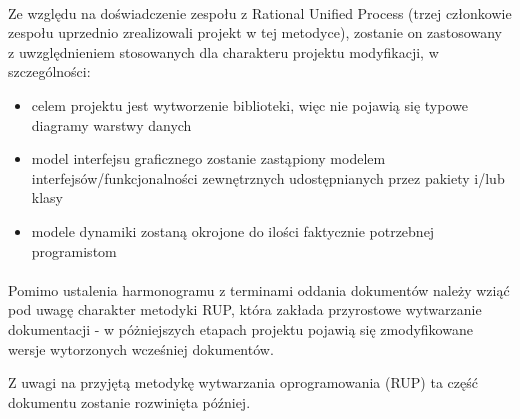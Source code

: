 \documentclass[a4paper,10pt]{article}
\begin{document}
\paragraph{} Ze względu na doświadczenie zespołu z Rational Unified Process (trzej członkowie zespołu uprzednio zrealizowali projekt w tej metodyce), zostanie on zastosowany z uwzględnieniem stosowanych dla charakteru projektu modyfikacji, w szczególności:
\begin{itemize}
 \item celem projektu jest wytworzenie biblioteki, więc nie pojawią się typowe diagramy warstwy danych
\item model interfejsu graficznego zostanie zastąpiony modelem interfejsów/funkcjonalności zewnętrznych udostępnianych przez pakiety i/lub klasy
\item modele dynamiki zostaną okrojone do ilości faktycznie potrzebnej programistom
\end{itemize}
\paragraph{}Pomimo ustalenia harmonogramu z terminami oddania dokumentów należy wziąć pod uwagę charakter metodyki RUP, która zakłada przyrostowe wytwarzanie dokumentacji - w póżniejszych etapach projektu pojawią się zmodyfikowane wersje wytorzonych wcześniej dokumentów.


Z uwagi na przyjętą metodykę wytwarzania oprogramowania (RUP) ta część dokumentu zostanie rozwinięta później.


\clearpage
{}
{}

\end{document}
